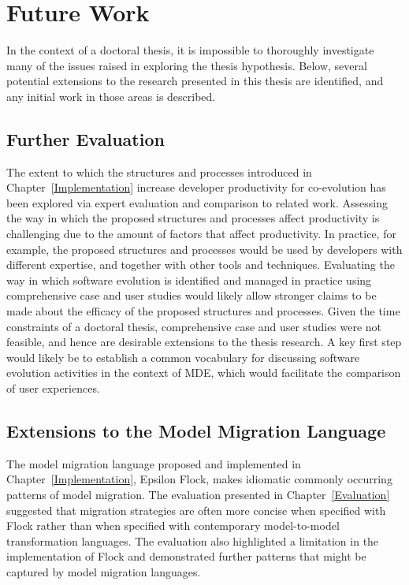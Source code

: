 
\section{Future Work}
\label{sec:future_work}
In the context of a doctoral thesis, it is impossible to thoroughly investigate many of the issues raised in exploring the thesis hypothesis. Below, several potential extensions to the research presented in this thesis are identified, and any initial work in those areas is described. 

\subsection{Further Evaluation}
The extent to which the structures and processes introduced in Chapter~\ref{Implementation} increase developer productivity for co-evolution has been explored via expert evaluation and comparison to related work. Assessing the way in which the proposed structures and processes affect productivity is challenging due to the amount of factors that affect productivity. In practice, for example, the proposed structures and processes would be used by developers with different expertise, and together with other tools and techniques. Evaluating the way in which software evolution is identified and managed in practice using comprehensive case and user studies would likely allow stronger claims to be made about the efficacy of the proposed structures and processes. Given the time constraints of a doctoral thesis, comprehensive case and user studies were not feasible, and hence are desirable extensions to the thesis research. A key first step would likely be to establish a common vocabulary for discussing software evolution activities in the context of MDE, which would facilitate the comparison of user experiences.

\subsection{Extensions to the Model Migration Language}
The model migration language proposed and implemented in Chapter~\ref{Implementation}, Epsilon Flock, makes idiomatic commonly occurring patterns of model migration. The evaluation presented in Chapter~\ref{Evaluation} suggested that migration strategies are often more concise when specified with Flock rather than when specified with contemporary model-to-model transformation languages. The evaluation also highlighted a limitation in the implementation of Flock and demonstrated further patterns that might be captured by model migration languages.

